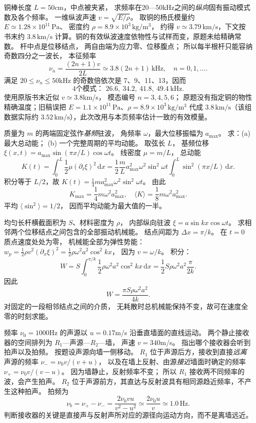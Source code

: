 铜棒长度 $L=50$cm，中点被夹紧，
求频率在20—50kHz之间的\emph{纵向}固有振动模式数及各个频率。
\exsolution
一维纵波声速
$v=\sqrt{E/\rho}$。
取铜的杨氏模量约
$E\simeq1.28\times10^{11}\,\mathrm{Pa}$、
密度约
$\rho=8.9\times10^3\,\mathrm{kg/m^3}$，
约得 $v\simeq3.79\,\mathrm{km/s}$，下文按书末约 $3.8\,\mathrm{km/s}$ 计算。铜的有效纵波速度依物性与试样而变，原题未给精确常数。
杆中点是位移结点，
两自由端为应力零、位移腹点；
所以每半根杆只能容纳奇数四分之一波长，
本征频率
\[
\boxed{\nu_n=\frac{(2n+1)v}{2L}
\simeq3.8(2n+1)\,\mathrm{kHz}},
\quad n=0,1,\ldots.
\]
满足 $20\le\nu_n\le50$kHz 的奇数倍依次是
7、9、11、13，因而
\[
\boxed{4\text{个模式： }
26.6,\ 34.2,\ 41.8,\ 49.4\ \mathrm{kHz}}.
\]
\excheck 使用原版书末近似 $v\simeq3.8$km/s，
模态编号 $n=3,4,5,6$；
原题没有指定铜的物性精确温度；旧稿误把 $E=1.1\times10^{11}\,\mathrm{Pa}$、$\rho=8.9\times10^3\,\mathrm{kg/m^3}$ 代成 $3.8\,\mathrm{km/s}$（该组数据实际约 $3.52\,\mathrm{km/s}$），此次改用与本页频率估计一致的有效模量。

质量为 $m$ 的两端固定弦作\emph{基频}驻波，
角频率 $\omega$，最大位移振幅为 $a_{\max}$。
求：(a) 最大总动能；
(b) 一个完整周期的平均动能。
\exsolution
取弦长 $L$，
基频位移
$\xi(x,t)=a_{\max}\sin(\pi x/L)\cos\omega t$。
线密度
$\mu=m/L$，
总动能
\[
K(t)=\int_0^L\frac12\mu
(\partial_t\xi)^2\,\mathrm dx
=\frac12\frac mL a_{\max}^2\omega^2
\sin^2\omega t\int_0^L\sin^2(\pi x/L)\,\mathrm dx.
\]
积分等于 $L/2$，故
$K(t)=\frac14m a_{\max}^2\omega^2\sin^2\omega t$。
由此
\[
\boxed{K_{\max}=\frac14m\omega^2a_{\max}^2},
\quad
\boxed{\langle K\rangle=\frac18m\omega^2a_{\max}^2}.
\]
\excheck 平均 $\langle\sin^2\rangle=1/2$，
因而平均动能为最大值的一半。

均匀长杆横截面积为 $S$、材料密度为 $\rho$，
内部纵向驻波
$\xi=a\sin kx\cos\omega t$。
求相邻两个位移结点之间包含的全部振动机械能。
\exsolution
结点间距为
$\Delta x=\pi/k$。
在 $t=0$ 质点速度处处为零，
机械能全部为弹性势能：
$w_p=\tfrac12\rho v^2(\partial_x\xi)^2
=\tfrac12\rho\omega^2a^2\cos^2kx$，
因为 $v=\omega/k$。
积分：
\[
W=S\int_0^{\pi/k}\frac12
\rho\omega^2a^2\cos^2kx\,\mathrm dx
=\frac12S\rho\omega^2a^2\frac{\pi}{2k}.
\]
因此
\[
\boxed{W=\frac{\pi S\rho\omega^2a^2}{4k}}.
\]
\excheck 对固定的一段相邻结点之间的介质，
无耗散时总机械能保持不变，故可在速度全零的时刻求能。

频率 $\nu_0=1000$Hz 的声源以
$u=0.17$m/s 沿垂直墙面的直线运动。
两个静止接收器的空间排列为
$R_1$—声源—$R_2$—墙，
声速 $v=340$m/s。
指出哪个接收器会听到拍声以及拍频。
\exsolution
按题设声源向墙一侧移动。
$R_1$ 位于声源后方，接收到直接\emph{远离}声源的频率
$\nu_-= \nu_0v/(v+u)$，
以及在墙上反射、由源\emph{接近}墙面时确定的频率
$\nu_+=\nu_0v/(v-u)$。
因为墙静止，反射频率不变；
所以 $R_1$ 接收两不同频率的波，会产生拍声。
$R_2$ 位于声源前方，其直达与反射波具有相同源趋近频率，不产生这种拍声。
拍频为
\[
\boxed{\nu_b=\nu_+-\nu_-=
\frac{2\nu_0vu}{v^2-u^2}
\simeq\frac{2\nu_0u}{v}
\simeq1.0\,\mathrm{Hz}}.
\]
\excheck 判断接收器的关键是直接声与反射声所对应的源径向运动方向，而不是离墙远近。

